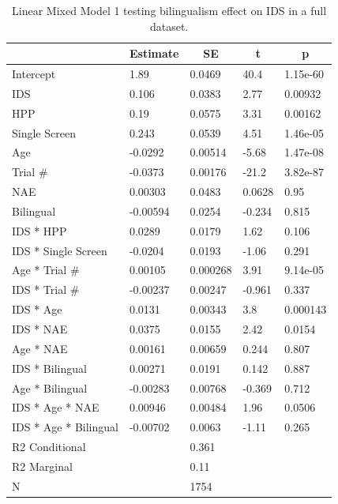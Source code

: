 \documentclass[,man,floatsintext]{apa6}
\begin{document}
\begin{table}[tbp]
\begin{center}
\begin{threeparttable}
\caption{\label{tab:unnamed-chunk-10}Linear Mixed Model 1 testing bilingualism effect on IDS in a full dataset.}
\begin{tabular}{lllll}
\toprule
 & \multicolumn{1}{c}{Estimate} & \multicolumn{1}{c}{SE} & \multicolumn{1}{c}{t} & \multicolumn{1}{c}{p}\\
\midrule
Intercept & 1.89 & 0.0469 & 40.4 & 1.15e-60\\
IDS & 0.106 & 0.0383 & 2.77 & 0.00932\\
HPP & 0.19 & 0.0575 & 3.31 & 0.00162\\
Single Screen & 0.243 & 0.0539 & 4.51 & 1.46e-05\\
Age & -0.0292 & 0.00514 & -5.68 & 1.47e-08\\
Trial \# & -0.0373 & 0.00176 & -21.2 & 3.82e-87\\
NAE & 0.00303 & 0.0483 & 0.0628 & 0.95\\
Bilingual & -0.00594 & 0.0254 & -0.234 & 0.815\\
IDS * HPP & 0.0289 & 0.0179 & 1.62 & 0.106\\
IDS * Single Screen & -0.0204 & 0.0193 & -1.06 & 0.291\\
Age * Trial \# & 0.00105 & 0.000268 & 3.91 & 9.14e-05\\
IDS * Trial \# & -0.00237 & 0.00247 & -0.961 & 0.337\\
IDS * Age & 0.0131 & 0.00343 & 3.8 & 0.000143\\
IDS * NAE & 0.0375 & 0.0155 & 2.42 & 0.0154\\
Age * NAE & 0.00161 & 0.00659 & 0.244 & 0.807\\
IDS * Bilingual & 0.00271 & 0.0191 & 0.142 & 0.887\\
Age * Bilingual & -0.00283 & 0.00768 & -0.369 & 0.712\\
IDS * Age * NAE & 0.00946 & 0.00484 & 1.96 & 0.0506\\
IDS * Age * Bilingual & -0.00702 & 0.0063 & -1.11 & 0.265\\ \midrule
R2 Conditional &  & 0.361 &  & \\
R2 Marginal &  & 0.11 &  & \\ \midrule
N &  & 1754 &  & \\
\bottomrule
\end{tabular}
\end{threeparttable}
\end{center}
\end{table}
\end{document}
